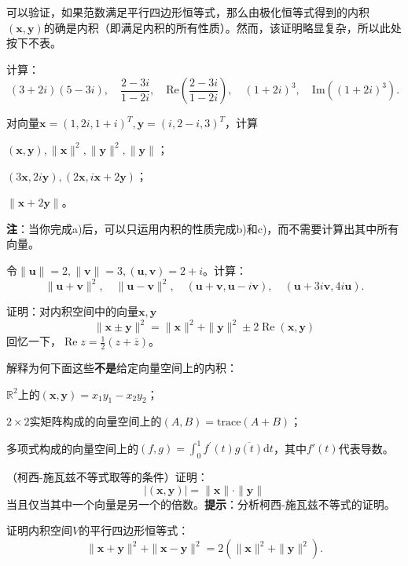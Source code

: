 可以验证，如果范数满足平行四边形恒等式，那么由极化恒等式得到的内积$(\mathbf{x},\mathbf{y})$的确是内积（即满足内积的所有性质）。然而，该证明略显复杂，所以此处按下不表。

\begin{problemset}
    \item 计算：\[(3+2i)(5-3i),\quad\frac{2-3i}{1-2i},\quad\mathrm{Re}\left(\frac{2-3i}{1-2i}\right),\quad(1+2i)^3,\quad\mathrm{Im}((1+2i)^3).\]
    \item 对向量$\mathbf{x}=(1,2i,1+i)^T,\mathbf{y}=(i,2-i,3)^T$，计算
    \begin{probenumerate}
        \item $(\mathbf{x},\mathbf{y}),\|\mathbf{x}\|^2,\|\mathbf{y}\|^2,\|\mathbf{y}\|$；
        \item $(3\mathbf{x},2i\mathbf{y}),(2\mathbf{x},i\mathbf{x}+2\mathbf{y})$；
        \item $\|\mathbf{x}+2\mathbf{y}\|$。
    \end{probenumerate}
    \textbf{注}：当你完成a)后，可以只运用内积的性质完成b)和c)，而不需要计算出其中所有向量。
    \item 令$\|\mathbf{u}\|=2,\|\mathbf{v}\|=3,(\mathbf{u},\mathbf{v})=2+i$。计算：
    \[\|\mathbf{u}+\mathbf{v}\|^2,\quad\|\mathbf{u}-\mathbf{v}\|^2,\quad(\mathbf{u}+\mathbf{v},\mathbf{u}-i\mathbf{v}),\quad(\mathbf{u}+3i\mathbf{v},4i\mathbf{u}).\]
    \item 证明：对内积空间中的向量$\mathbf{x},\mathbf{y}$\[\|\mathbf{x}\pm\mathbf{y}\|^2=\|\mathbf{x}\|^2+\|\mathbf{y}\|^2\pm2\operatorname{Re}(\mathbf{x},\mathbf{y})\]
    回忆一下，$\operatorname{Re}z=\frac12(z+\overline{z})$。
    \item 解释为何下面这些{\bf 不是}给定向量空间上的内积：
    \begin{probenumerate}
        \item $\mathbb{R}^{2}$上的$(\mathbf{x},\mathbf{y})=x_{1}y_{1}-x_{2}y_{2}$；
        \item $2\times 2$实矩阵构成的向量空间上的$(A,B)=\mathrm{trace}(A+B)$；
        \item 多项式构成的向量空间上的$(f,g)=\int_0^1f^{\prime}(t)\overline{g(t)}\mathrm{d}t$，其中$f'(t)$代表导数。
    \end{probenumerate}
    \item （柯西-施瓦兹不等式取等的条件）证明：\[|(\mathbf{x},\mathbf{y})|=\|\mathbf{x}\|\cdot\|\mathbf{y}\|\]当且仅当其中一个向量是另一个的倍数。\textbf{提示}：分析柯西-施瓦兹不等式的证明。
    \item 证明内积空间$V$的平行四边形恒等式：\[\|\mathbf{x}+\mathbf{y}\|^2+\|\mathbf{x}-\mathbf{y}\|^2=2(\|\mathbf{x}\|^2+\|\mathbf{y}\|^2).\]

\end{problemset}
